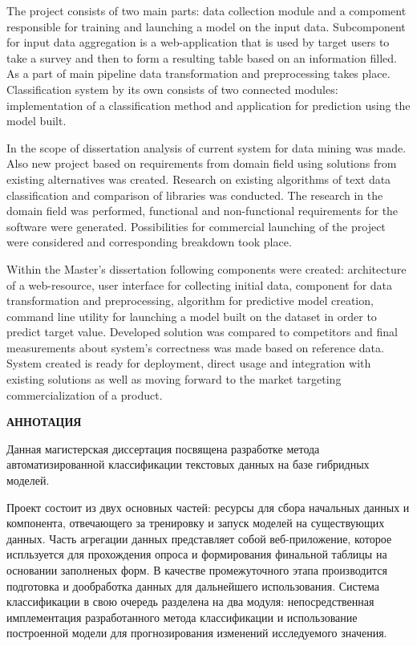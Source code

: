 The project consists of two main parts: data collection module and a compoment responsible for training and launching a model on the input data. Subcomponent for input data aggregation is a web-application that is used by target users to take a survey and then to form a resulting table based on an information filled. As a part of main pipeline data transformation and preprocessing takes place. Classification system by its own consists of two connected modules: implementation of a classification method and application for prediction using the model built.

In the scope of dissertation analysis of current system for data mining was made. Also new project based on requirements from domain field using solutions from existing alternatives was created. Research on existing algorithms of text data classification and comparison of libraries was conducted. The research in the domain field was performed, functional and non-functional requirements for the software were generated. Possibilities for commercial launching of the project were considered and corresponding breakdown took place.

Within the Master's dissertation following components were created: architecture of a web-resource, user interface for collecting initial data, component for data transformation and preprocessing, algorithm for predictive model creation, command line utility for launching a model built on the dataset in order to predict target value. Developed solution was compared to competitors and final measurements about system's correctness was made based on reference data. System created is ready for deployment, direct usage and integration with existing solutions as well as moving forward to the market targeting commercialization of a product.

\newpage
\begin{center}
	\textbf{\uppercase{Аннотация}}
\end{center}

Данная магистерская диссертация посвящена разработке метода автоматизированной классификации текстовых данных на базе гибридных моделей.

Проект состоит из двух основных частей: ресурсы для сбора начальных данных и компонента, отвечающего за тренировку и запуск моделей на существующих данных. Часть агрегации данных представляет собой веб-приложение, которое испльзуется для прохождения опроса и формирования финальной таблицы на основании заполненых форм. В качестве промежуточного этапа производится подготовка и дообработка данных для дальнейшего использования. Система классификации в свою очередь разделена на два модуля: непосредственная имплементация разработанного метода классификации и использование построенной модели для прогнозирования изменений исследуемого значения.


